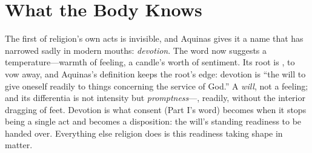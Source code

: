 \section{What the Body Knows}

The first of religion's own acts is invisible, and Aquinas gives it a name that has narrowed sadly in modern mouths: \emph{devotion}. The word now suggests a temperature---warmth of feeling, a candle's worth of sentiment. Its root is , to vow away, and Aquinas's definition keeps the root's edge: devotion is ``the will to give oneself readily to things concerning the service of God.'' A \emph{will}, not a feeling; and its differentia is not intensity but \emph{promptness}---, readily, without the interior dragging of feet. Devotion is what consent (Part I's word) becomes when it stops being a single act and becomes a disposition: the will's standing readiness to be handed over. Everything else religion does is this readiness taking shape in matter.

